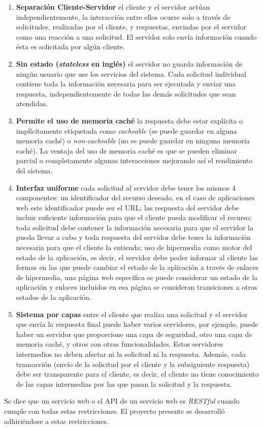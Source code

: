 \begin{enumerate}
    \item \textbf{Separación Cliente-Servidor} el cliente y el servidor actúan independientemente, la interacción entre ellos ocurre solo a través de solicitudes, realizadas por el cliente, y respuestas, enviadas por el servidor como una reacción a una solicitud. El servidor solo envía información cuando ésta es solicitada por algún cliente.
    \item \textbf{Sin estado (\emph{stateless} en inglés)} el servidor no guarda información de ningún usuario que use los servicios del sistema. Cada solicitud individual contiene toda la información necesaria para ser ejecutada y enviar una respuesta, independientemente de todas las demás solicitudes que sean atendidas.
    \item \textbf{Permite el uso de memoria caché} la respuesta debe estar explícita o implícitamente etiquetada como \textit{cacheable} (se puede guardar en alguna memoria caché) o \textit{non-cacheable} (no se puede guardar en ninguna memoria caché). La ventaja del uso de memoria caché es que se pueden eliminar parcial o completamente algunas interacciones mejorando así el rendimiento del sistema.
    \item \textbf{Interfaz uniforme} cada solicitud al servidor debe tener los mismos 4 componentes: un identificador del recurso deseado, en el caso de aplicaciones web este identificador puede ser el URL; las respuesta del servidor debe incluir suficiente información para que el cliente pueda modificar el recurso; toda solicitud debe contener la información necesaria para que el servidor la pueda llevar a cabo y toda respuesta del servidor debe tener la información necesaria para que el cliente la entienda; uso de hipermedia como motor del estado de la aplicación, es decir, el servidor debe poder informar al cliente las formas en las que puede cambiar el estado de la aplicación a través de enlaces de hipermedia, una página web específica se puede considerar un estado de la aplicación y enlaces incluidos en esa página se consideran transiciones a otros estados de la aplicación.
    \item \textbf{Sistema por capas} entre el cliente que realiza una solicitud y el servidor que envía la respuesta final puede haber varios servidores, por ejemplo, puede haber un servidor que proporcione una capa de seguridad, otro una capa de memoria caché, y otros con otras funcionalidades. Estos servidores intermedios no deben afectar ni la solicitud ni la respuesta. Además, cada transacción (envío de la solicitud por el cliente y la subsiguiente respuesta) debe ser transparente para el cliente, es decir, el cliente no tiene conocimiento de las capas intermedias por las que pasan la solicitud y la respuesta.
\end{enumerate}

Se dice que un servicio web o el API de un servicio web es \textit{RESTful} cuando cumple con todas estas restricciones. El proyecto presente se desarrolló adhiriéndose a estas restricciones.